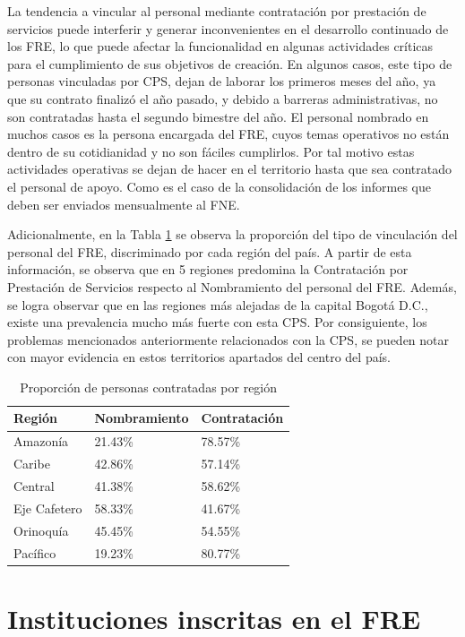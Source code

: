 \documentclass[
]{book}
\begin{document}
La tendencia a vincular al personal mediante contratación por prestación de servicios puede interferir y generar inconvenientes en el desarrollo continuado de los FRE, lo que puede afectar la funcionalidad en algunas actividades críticas para el cumplimiento de sus objetivos de creación. En algunos casos, este tipo de personas vinculadas por CPS, dejan de laborar los primeros meses del año, ya que su contrato finalizó el año pasado, y debido a barreras administrativas, no son contratadas hasta el segundo bimestre del año. El personal nombrado en muchos casos es la persona encargada del FRE, cuyos temas operativos no están dentro de su cotidianidad y no son fáciles cumplirlos. Por tal motivo estas actividades operativas se dejan de hacer en el territorio hasta que sea contratado el personal de apoyo. Como es el caso de la consolidación de los informes que deben ser enviados mensualmente al FNE.

Adicionalmente, en la Tabla \ref{tab:CaracterizacionIngreso1} se observa la proporción del tipo de vinculación del personal del FRE, discriminado por cada región del país. A partir de esta información, se observa que en 5 regiones predomina la Contratación por Prestación de Servicios respecto al Nombramiento del personal del FRE. Además, se logra observar que en las regiones más alejadas de la capital Bogotá D.C., existe una prevalencia mucho más fuerte con esta CPS. Por consiguiente, los problemas mencionados anteriormente relacionados con la CPS, se pueden notar con mayor evidencia en estos territorios apartados del centro del país.

\begin{table}

\caption{\label{tab:CaracterizacionIngreso1}Proporción de personas contratadas por región}
\centering
\begin{tabular}[t]{lll}
\toprule
Región & Nombramiento & Contratación\\
\midrule
Amazonía & 21.43\% & 78.57\%\\
Caribe & 42.86\% & 57.14\%\\
Central & 41.38\% & 58.62\%\\
Eje Cafetero & 58.33\% & 41.67\%\\
Orinoquía & 45.45\% & 54.55\%\\
\addlinespace
Pacífico & 19.23\% & 80.77\%\\
\bottomrule
\end{tabular}
\end{table}

\hypertarget{instituciones-inscritas-en-el-fre}{%
\section{Instituciones inscritas en el FRE}\label{instituciones-inscritas-en-el-fre}}
\end{document}
